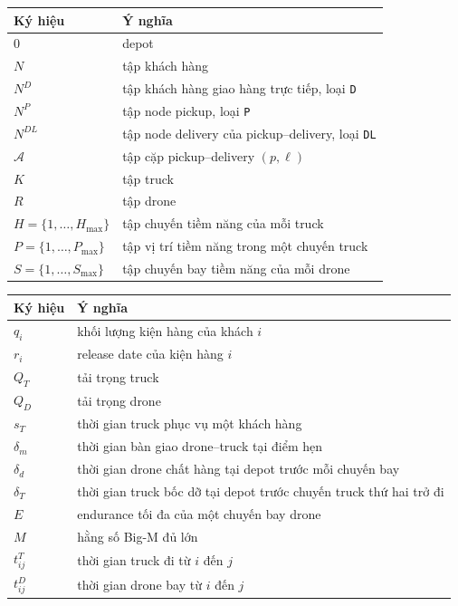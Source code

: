 \documentclass[12pt,a4paper]{article}
\begin{document}
\begin{table}[h]
\centering
\begin{tabular}{ll}
\toprule
Ký hiệu & Ý nghĩa\\
\midrule
\(0\) & depot\\
\(N\) & tập khách hàng\\
\(N^D\) & tập khách hàng giao hàng trực tiếp, loại \texttt{D}\\
\(N^P\) & tập node pickup, loại \texttt{P}\\
\(N^{DL}\) & tập node delivery của pickup--delivery, loại \texttt{DL}\\
\(\mathcal A\) & tập cặp pickup--delivery \((p,\ell)\)\\
\(K\) & tập truck\\
\(R\) & tập drone\\
\(H=\{1,\ldots,H_{\max}\}\) & tập chuyến tiềm năng của mỗi truck\\
\(P=\{1,\ldots,P_{\max}\}\) & tập vị trí tiềm năng trong một chuyến truck\\
\(S=\{1,\ldots,S_{\max}\}\) & tập chuyến bay tiềm năng của mỗi drone\\
\bottomrule
\end{tabular}
\end{table}

\begin{table}[h]
\centering
\begin{tabular}{ll}
\toprule
Ký hiệu & Ý nghĩa\\
\midrule
\(q_i\) & khối lượng kiện hàng của khách \(i\)\\
\(r_i\) & release date của kiện hàng \(i\)\\
\(Q_T\) & tải trọng truck\\
\(Q_D\) & tải trọng drone\\
\(s_T\) & thời gian truck phục vụ một khách hàng\\
\(\delta_m\) & thời gian bàn giao drone--truck tại điểm hẹn\\
\(\delta_d\) & thời gian drone chất hàng tại depot trước mỗi chuyến bay\\
\(\delta_T\) & thời gian truck bốc dỡ tại depot trước chuyến truck thứ hai trở đi\\
\(E\) & endurance tối đa của một chuyến bay drone\\
\(M\) & hằng số Big-M đủ lớn\\
\(t^T_{ij}\) & thời gian truck đi từ \(i\) đến \(j\)\\
\(t^D_{ij}\) & thời gian drone bay từ \(i\) đến \(j\)\\
\bottomrule
\end{tabular}
\end{table}
\end{document}
